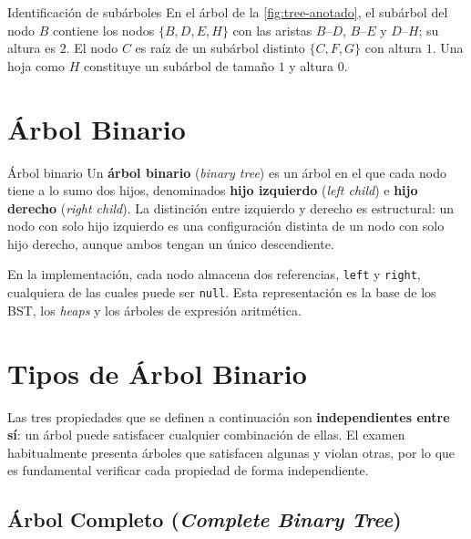 \begin{ejemplo}{Identificación de subárboles}
En el árbol de la \cref{fig:tree-anotado}, el subárbol del nodo $B$ contiene los nodos
$\{B, D, E, H\}$ con las aristas $B\text{--}D$, $B\text{--}E$ y $D\text{--}H$; su altura
es $2$. El nodo $C$ es raíz de un subárbol distinto $\{C, F, G\}$ con altura $1$. Una
hoja como $H$ constituye un subárbol de tamaño $1$ y altura $0$.
\end{ejemplo}

\section{Árbol Binario}
\label{sec:binary-tree}

\begin{definicion}{Árbol binario}
Un \textbf{árbol binario} (\textit{binary tree}) es un árbol en el que cada nodo tiene a
lo sumo dos hijos, denominados \textbf{hijo izquierdo} (\textit{left child}) e \textbf{hijo
derecho} (\textit{right child}). La distinción entre izquierdo y derecho es estructural:
un nodo con solo hijo izquierdo es una configuración distinta de un nodo con solo hijo
derecho, aunque ambos tengan un único descendiente.
\end{definicion}

En la implementación, cada nodo almacena dos referencias, \texttt{left} y \texttt{right},
cualquiera de las cuales puede ser \texttt{null}. Esta representación es la base de los
BST, los \textit{heaps} y los árboles de expresión aritmética.

\section{Tipos de Árbol Binario}
\label{sec:tree-types}

Las tres propiedades que se definen a continuación son \textbf{independientes entre sí}:
un árbol puede satisfacer cualquier combinación de ellas. El examen habitualmente presenta
árboles que satisfacen algunas y violan otras, por lo que es fundamental verificar cada
propiedad de forma independiente.

\subsection{Árbol Completo (\textit{Complete Binary Tree})}
\label{subsec:complete}

